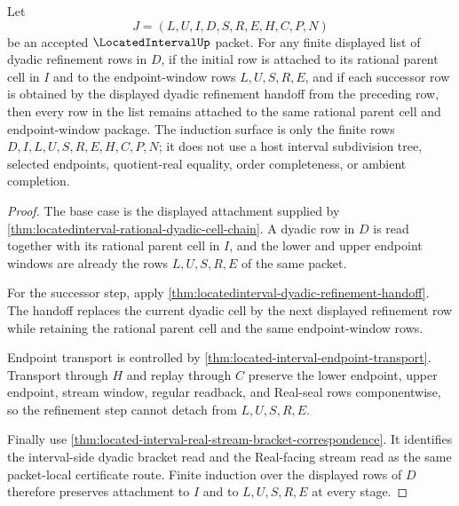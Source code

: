 \begin{theorem}
\label{thm:located-interval-dyadic-refinement-induction}
Let
$$
J=(L,U,I,D,S,R,E,H,C,P,N)
$$
be an accepted $\LocatedIntervalUp$ packet. For any finite displayed list of dyadic refinement rows in $D$, if the initial row is attached to its rational parent cell in $I$ and to the endpoint-window rows $L,U,S,R,E$, and if each successor row is obtained by the displayed dyadic refinement handoff from the preceding row, then every row in the list remains attached to the same rational parent cell and endpoint-window package. The induction surface is only the finite rows $D,I,L,U,S,R,E,H,C,P,N$; it does not use a host interval subdivision tree, selected endpoints, quotient-real equality, order completeness, or ambient completion.
\end{theorem}
\begin{proof}
The base case is the displayed attachment supplied by \autoref{thm:locatedinterval-rational-dyadic-cell-chain}. A dyadic row in $D$ is read together with its rational parent cell in $I$, and the lower and upper endpoint windows are already the rows $L,U,S,R,E$ of the same packet.

For the successor step, apply \autoref{thm:locatedinterval-dyadic-refinement-handoff}. The handoff replaces the current dyadic cell by the next displayed refinement row while retaining the rational parent cell and the same endpoint-window rows.

Endpoint transport is controlled by \autoref{thm:located-interval-endpoint-transport}. Transport through $H$ and replay through $C$ preserve the lower endpoint, upper endpoint, stream window, regular readback, and Real-seal rows componentwise, so the refinement step cannot detach from $L,U,S,R,E$.

Finally use \autoref{thm:located-interval-real-stream-bracket-correspondence}. It identifies the interval-side dyadic bracket read and the Real-facing stream read as the same packet-local certificate route. Finite induction over the displayed rows of $D$ therefore preserves attachment to $I$ and to $L,U,S,R,E$ at every stage.
\end{proof}



